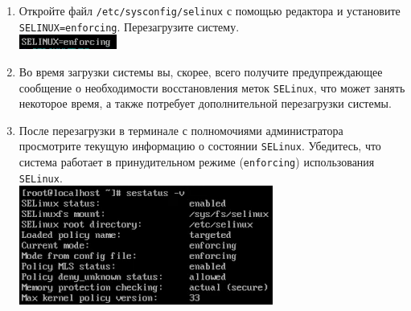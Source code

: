 \documentclass[12pt]{article}
\begin{document}
\begin{enumerate}
	\item Откройте файл \texttt{/etc/sysconfig/selinux} с помощью редактора и установите \texttt{SELINUX=enforcing}. Перезагрузите систему.
	      \\\includegraphics{7.png}
	\item Во время загрузки системы вы, скорее, всего получите предупреждающее сообщение о необходимости восстановления меток \texttt{SELinux}, что может занять некоторое время, а также потребует дополнительной перезагрузки системы.
	\item После перезагрузки в терминале с полномочиями администратора просмотрите текущую информацию о состоянии \texttt{SELinux}. Убедитесь, что система работает в принудительном режиме (\texttt{enforcing}) использования \texttt{SELinux}.
	      \\\includegraphics{8.png}
\end{enumerate}
\end{document}

